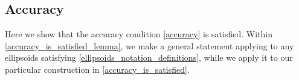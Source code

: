 \subsection{Accuracy}
\label{accuracy_section}

Here we show that the accuracy condition \cref{accuracy} is satisfied.
Within \cref{accuracy_is_satisfied_lemma}, we make a general statement applying to any ellipsoids satisfying \cref{ellipsoids_notation_definitions},
while we apply it to our particular construction in \cref{accuracy_is_satisfied}.





